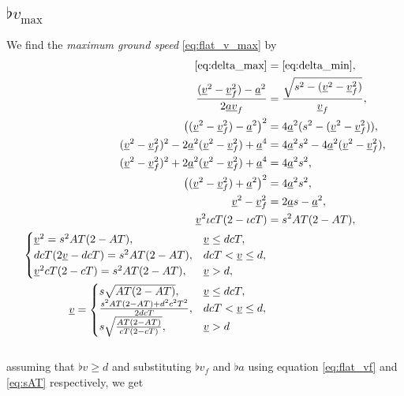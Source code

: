 \subsection{\texorpdfstring{$\flat{v}_{\max}$}{flat v\_max}}
\label{app:derive_flat_v_max}
We find the \emph{maximum ground speed} \eqref{eq:flat_v_max} by
\begin{align}
\nonumber
\eqref{eq:delta_max} &= \eqref{eq:delta_min},\\
\nonumber
\frac{(\flat{v}^2 - \flat{v}_f^2) - \flat{a}^2}{2 \flat{a}\flat{v}_f} &= \frac{\sqrt{s^2 - (\flat{v}^2 - \flat{v}_f^2)}}{\flat{v}_f},\\
\nonumber
\left((\flat{v}^2 - \flat{v}_f^2) - \flat{a}^2\right)^2 &= 4 \flat{a}^2(s^2 - (\flat{v}^2 - \flat{v}_f^2)),\\
\nonumber
(\flat{v}^2 - \flat{v}_f^2)^2 - 2 \flat{a}^2(\flat{v}^2 - \flat{v}_f^2) + \flat{a}^4 &= 4 \flat{a}^2s^2 - 4 \flat{a}^2 (\flat{v}^2 - \flat{v}_f^2),\\
\nonumber
(\flat{v}^2 - \flat{v}_f^2)^2 + 2 \flat{a}^2(\flat{v}^2 - \flat{v}_f^2) + \flat{a}^4 &= 4 \flat{a}^2 s^2,\\
\nonumber
\left((\flat{v}^2 - \flat{v}_f^2) + \flat{a}^2\right)^2 &= 4 \flat{a}^2s^2,\\
\label{eq:maxgs}
\flat{v}^2 - \flat{v}_f^2 &= 2 \flat{a} s - \flat{a}^2,\\
\label{eq:maxgs_iota}
\flat{v}^2 \iota cT (2 - \iota cT) &= s^2 AT(2 - AT),\\
\begin{cases}
\flat{v}^2 = s^2 AT(2 - AT), &\flat{v} \le d cT,\\
d cT (2 \flat{v} - d cT) = s^2 AT(2 - AT), &d cT < \flat{v} \le d,\\
\flat{v}^2 cT (2 - cT) = s^2 AT(2 - AT), &\flat{v} > d,\\
\end{cases}\\
\flat{v} =
\begin{cases}
s \sqrt{AT(2 - AT)}, &\flat{v} \le d cT,\\
\frac{s^2 AT(2 - AT) + d^2 c^2 T^2}{2 d cT}, &d cT < \flat{v} \le d,\\
s \sqrt{\frac{AT(2 - AT)}{cT (2 - cT)}}, &\flat{v} > d\\
\end{cases}
\end{align}\\
assuming that $\flat{v} \ge d$ and substituting $\flat{v}_f$ and $\flat{a}$ using equation \eqref{eq:flat_vf} and \eqref{eq:sAT} respectively, we get
